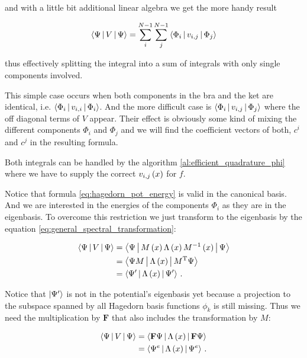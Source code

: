 and with a little bit additional linear algebra we get the more handy result

\begin{equation} \label{eq:hagedorn_pot_energy}
  \Braket{\Psi | V | \Psi} = \sum_i^{N-1} \sum_j^{N-1} \Braket{ \Phi_i | v_{i,j} | \Phi_j }
\end{equation}

thus effectively splitting the integral into a sum of integrals with only single
components involved.

This simple case occurs when both components in the bra and the ket are identical,
i.e. $\Braket{ \Phi_i | v_{i,i} | \Phi_i }$. And the more difficult case is
$\Braket{ \Phi_i | v_{i,j} | \Phi_j }$ where the off diagonal terms of $V$ appear.
Their effect is obviously some kind of mixing the different components $\Phi_i$
and $\Phi_j$ and we will find the coefficient vectors of both, $c^i$ and $c^j$ in
the resulting formula.

Both integrals can be handled by the algorithm \ref{al:efficient_quadrature_phi}
where we have to supply the correct $v_{i,j}\left( x \right)$ for $f$.

Notice that formula \eqref{eq:hagedorn_pot_energy} is valid in the canonical basis.
And we are interested in the energies of the components $\Phi_i$ as they are
in the eigenbasis. To overcome this restriction we just transform to the
eigenbasis by the equation \eqref{eq:general_spectral_transformation}:

\begin{equation}
\begin{split}
    \Braket{\Psi | V | \Psi} & = \Braket{\Psi | M\left( x \right) \Lambda\left( x \right) M^{-1}\left( x \right) | \Psi} \\
                             & = \Braket{\Psi M | \Lambda\left( x \right) | M{}^{\textnormal{T}} \Psi} \\
                             & = \Braket{\Psi^\prime | \Lambda\left( x \right) | \Psi^\prime} \,.
\end{split}
\end{equation}

Notice that $\Ket{\Psi^\prime}$ is not in the potential's eigenbasis yet because a
projection to the subspace spanned by all Hagedorn basis functions $\phi_k$ is
still missing. Thus we need the multiplication by $\mathbf{F}$ that also includes
the transformation by $M$:

\begin{equation}
  \begin{split}
    \Braket{\Psi | V | \Psi} & = \Braket{\mathbf{F}\Psi | \Lambda\left( x \right) | \mathbf{F} \Psi} \\
                             & = \Braket{\Psi^e | \Lambda\left( x \right) | \Psi^e} \,.
\end{split}
\end{equation}

